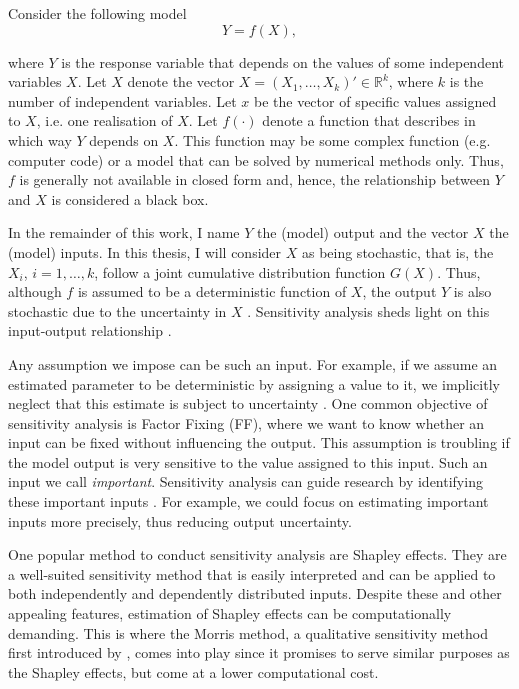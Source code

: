 
\noindent Consider the following model
\begin{equation*}
Y = f(X),
\end{equation*}

\noindent where $Y$ is the response variable that depends on the values of some independent variables $X$. Let $X$ denote the vector $X = (X_1, \dots, X_k)' \in \mathbb{R}^k$, where $k$ is the number of independent variables. Let $x$ be the vector of specific values assigned to $X$, i.e. one realisation of $X$. Let $f(\cdot)$ denote a function that describes in which way $Y$ depends on $X$. This function may be some complex function (e.g. computer code) or a model that can be solved by numerical methods only. Thus, $f$ is generally not available in closed form and, hence, the relationship between $Y$ and $X$ is considered a black box.

In the remainder of this work, I name $Y$ the (model) output and the vector $X$ the (model) inputs. In this thesis, I will consider $X$ as being stochastic, that is, the $X_i$, $i = 1,\dots, k$, follow a joint cumulative distribution function $G(X)$. Thus, although $f$ is assumed to be a deterministic function of $X$, the output $Y$ is also stochastic due to the uncertainty in $X$ \citep{SNS16}. Sensitivity analysis sheds light on this input-output relationship \citep{BP16}.

Any assumption we impose can be such an input. For example, if we assume an estimated parameter to be deterministic by assigning a value to it, we implicitly neglect that this estimate is subject to uncertainty \citep{R21}. One common objective of sensitivity analysis is Factor Fixing (FF), where we want to know whether an input can be fixed without influencing the output. This assumption is troubling if the model output is very sensitive to the value assigned to this input. Such an input we call \textit{important}. Sensitivity analysis can guide research by identifying these important inputs \citep{R21}. For example, we could focus on estimating important inputs more precisely, thus reducing output uncertainty.


One popular method to conduct sensitivity analysis are Shapley effects. They are a well-suited sensitivity method that is easily interpreted and can be applied to both independently and dependently distributed inputs. Despite these and other appealing features, estimation of Shapley effects can be computationally demanding. This is where the Morris method, a qualitative sensitivity method first introduced by \citep{M91}, comes into play since it promises to serve similar purposes as the Shapley effects, but come at a lower computational cost.

